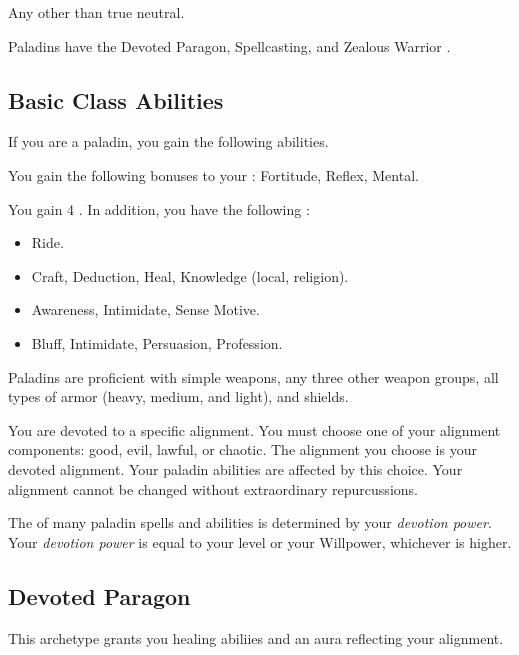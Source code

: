      Any other than true neutral.

     Paladins have the Devoted Paragon, Spellcasting, and Zealous Warrior .

    \subsection{Basic Class Abilities}
        If you are a paladin, you gain the following abilities.

        You gain the following bonuses to your :  Fortitude,  Reflex,  Mental.

        You gain 4 .
        In addition, you have the following :
        \begin{itemize}
            \item {} Ride.
            \item {} Craft, Deduction, Heal, Knowledge (local, religion).
            \item {} Awareness, Intimidate, Sense Motive.
            \item {} Bluff, Intimidate, Persuasion, Profession.
        \end{itemize}

        Paladins are proficient with simple weapons, any three other weapon groups, all types of armor (heavy, medium, and light), and shields.

        You are devoted to a specific alignment.
        You must choose one of your alignment components: good, evil, lawful, or chaotic.
        The alignment you choose is your devoted alignment.
        Your paladin abilities are affected by this choice.
        Your alignment cannot be changed without extraordinary repurcussions.

        The  of many paladin spells and abilities is determined by your \textit{devotion power}.
        Your \textit{devotion power} is equal to your level or your Willpower, whichever is higher.

    \subsection{Devoted Paragon}
        This archetype grants you healing abiliies and an aura reflecting your alignment.

